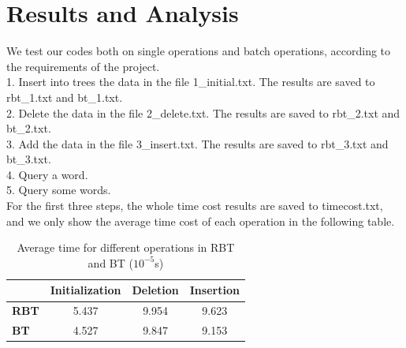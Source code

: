 \documentclass[UTF8]{ctexart}
\begin{document}
\section{Results and Analysis}
We test our codes both on single operations and batch operations, according to the requirements of the project.\\
1. Insert into trees the data in the file 1\_initial.txt. The results are saved to rbt\_1.txt and bt\_1.txt.\\
2. Delete the data in the file 2\_delete.txt. The results are saved to rbt\_2.txt and bt\_2.txt.\\
3. Add the data in the file 3\_insert.txt. The results are saved to rbt\_3.txt and bt\_3.txt.\\
4. Query a word.\\
5. Query some words.\\
For the first three steps, the whole time cost results are saved to timecost.txt, and we only show the average time cost of each operation in the following table.\\
\begin{table}[h]
    \centering
    \caption{Average time for different operations in RBT and BT ($10^{-5}$s)}
    \label{tab:times}
    \begin{tabular}{lccc}
    \toprule
        & \textbf{Initialization} & \textbf{Deletion} & \textbf{Insertion} \\
    \midrule
    \textbf{RBT} & \num{5.437} & \num{9.954} & \num{9.623} \\
    \textbf{BT} & \num{4.527} & \num{9.847} & \num{9.153} \\
    \bottomrule
    \end{tabular}
    \end{table}
\end{document}
